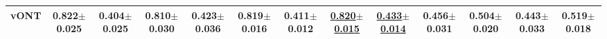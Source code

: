 \documentclass[11pt]{article}
\begin{document}
\begin{table*}[ ]
{\begin{tabular}{c|cccc|cccc|cccc|}
\hline
\textbf{vONT}                                             & \textbf{0.822$\pm$0.025 }                                                   & \textbf{0.404$\pm$0.025 }                                                & \textbf{0.810$\pm$0.030}                                                     & \textbf{0.423$\pm$0.036 }                                                 & \textbf{0.819$\pm$0.016   }                                                 & \textbf{0.411$\pm$0.012  }                                               & \underline{0.820$\pm$0.015    }                                                 & \underline{0.433$\pm$0.014   }                                               & \textbf{0.456$\pm$0.031}                                                    & \textbf{0.504$\pm$0.020  }                                               & \textbf{0.443$\pm$0.033  }                                                   & \textbf{0.519$\pm$0.018   }           \\                                   
\hline
\end{tabular}}
\end{table*}


















\tabcolsep=0.09cm
\end{document}
